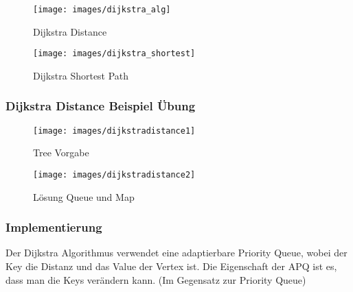 \begin{figure}[ht!]
	\centering
	\begin{minipage}[t]{0.4\textwidth}
		\centering
		\texttt{[image: images/dijkstra\_alg]}
		\caption{Dijkstra Distance}
		\label{fig:dijkstraalg}
	\end{minipage}
	\begin{minipage}[t]{0.4\textwidth}
		\centering
		\texttt{[image: images/dijkstra\_shortest]}
		\caption{Dijkstra Shortest Path}
		\label{fig:dijkstrashort}
	\end{minipage}
\end{figure}

\clearpage

\subsubsection{Dijkstra Distance Beispiel Übung}
\begin{figure}[ht!]
	\centering
	\begin{minipage}[t]{0.4\textwidth}
		\centering
		\texttt{[image: images/dijkstradistance1]}
		\caption{Tree Vorgabe}
		\label{fig:treevorgabe}
	\end{minipage}
	\begin{minipage}[t]{0.9\textwidth}
		\centering
		\texttt{[image: images/dijkstradistance2]}
		\caption{Lösung Queue und Map}
		\label{fig:loesungqueuemap}
	\end{minipage}
\end{figure}

\clearpage
\subsubsection{Implementierung}
Der Dijkstra Algorithmus verwendet eine adaptierbare Priority Queue, wobei der Key die Distanz und das Value der Vertex ist. Die Eigenschaft der APQ ist es, dass man die Keys verändern kann. (Im Gegensatz zur Priority Queue)


